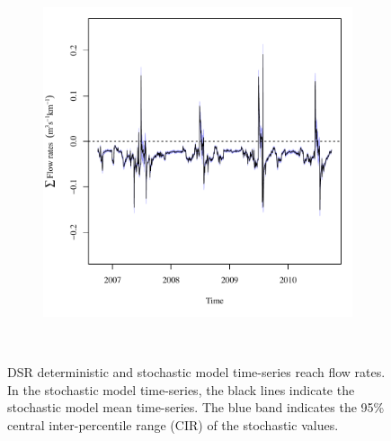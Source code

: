 \begin{linenumbers}
\begin{landscape}
\begin{figure}
\begin{subfigure}{0.7\textwidth}
			\includegraphics[width=\tableCustomSize]{"Figures/Results_DSR/Stochastic/Balance Water - flow"}
		\end{subfigure}\\
		\caption[DSR deterministic and stochastic model time-series reach flow rates.]{DSR deterministic and stochastic model time-series reach flow rates.  In the stochastic model time-series, the black lines indicate the stochastic model mean time-series.  The blue band indicates the 95\% central inter-percentile range (CIR) of the stochastic values.}
		\label{fig:reachFlow_DS}
	\end{figure}
\end{landscape}

\subtabletop
\begin{table}[htbp]
	\centering
	\caption[USR deterministic and stochastic model time-series reach total average daily flow rate numeric results.]{USR deterministic and stochastic model reach total time-series average daily flow rate numeric results.  Flow rates are presented in units of \si{\cubic\meter\per\second\per\kilo\meter} (\si{\cfs\per\mile}).}
	\label{tab:reachFlow_US}
	
\end{table}
\tablevspace
\begin{table}[htbp]
	\centering
	\caption[DSR deterministic and stochastic model time-series reach total average daily flow rate numeric results.]{DSR deterministic and stochastic model reach total time-series average daily flow rate numeric results.  Flow rates are presented in units of \si{\cubic\meter\per\second\per\kilo\meter} (\si{\cfs\per\mile}).}
	\label{tab:reachFlow_DS}
	
\end{table}


\end{linenumbers}
